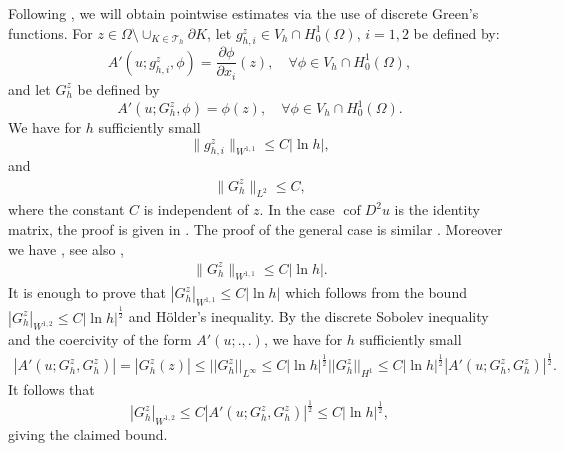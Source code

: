 \documentclass[12pt]{amsart}
\numberwithin{equation}{section}
\newcommand\cof{\operatorname{cof}}
\begin{document}
Following \cite{Xu1996}, we will obtain pointwise estimates via the use of discrete Green's functions. For $z\in \Omega \setminus \cup_{K \in \mathcal{T}_h}\partial K$, let $g^z_{h,i} \in V_h \cap H_0^1(\Omega)$, $i=1,2$ be defined by:
\begin{equation}\label{2grid-green1}
A'(u; g^z_{h,i},\phi)=\frac{\partial \phi}{\partial x_i}(z),  \quad \forall \phi \in V_h \cap H_0^1(\Omega),
\end{equation}
and let $G^z_h$ be defined by
\begin{equation}\label{2grid-green2}
A'(u;G^z_h,\phi) = \phi (z), \quad \forall \phi \in V_h \cap H_0^1(\Omega).
\end{equation}
We have for $h$ sufficiently small
\begin{equation}\label{2grid-W11greenbound}
\|g^z_{h,i}\|_{W^{1,1}} \leq C |\ln h|,
\end{equation}
and
\begin{align*} 
\|G^z_h\|_{L^{2}} \leq C,
\end{align*}
where the constant $C$ is independent of $z$. In the case $\cof D^2 u$ is the identity matrix, the proof is given in \cite[Lemmas 2.1 and 3.3]{ThomeeXuZhang}. The proof of the general case is similar \cite{Malitz-thesis}. Moreover
we have \cite{Malitz-thesis}, see also \cite[Exercise 8.x.19]{Brenner08},
\begin{align} \label{green-0}
\|G^z_h\|_{W^{1,1}} \leq C|\ln h|.
\end{align}
It is enough to prove that $|G^z_h |_{W^{1,1}} \leq C|\ln h|$ which follows from the bound
$| G^z_h |_{W^{1,2}} \leq C | \ln h|^{\frac{1}{2}} $ and H\"older's inequality. 
By the discrete Sobolev inequality \cite[(4.9.2)]{Brenner08} and the coercivity of the form $A'(u; .,.)$, we have for $h$ sufficiently small
\begin{align*}
| A'(u;G^z_h,G^z_h) | = | G^z_h (z)| \leq || G^z_h ||_{L^{\infty}} \leq C  | \ln h|^{\frac{1}{2}} || G^z_h ||_{H^{1}} \leq C  | \ln h|^{\frac{1}{2}} 
|A'(u;G^z_h,G^z_h)|^{\frac{1}{2}}. 
\end{align*}
It follows that
$$
| G^z_h |_{W^{1,2}}  \leq C |A'(u;G^z_h,G^z_h)|^{\frac{1}{2}} \leq C  | \ln h|^{\frac{1}{2}},
$$
giving the claimed bound.
\end{document}
